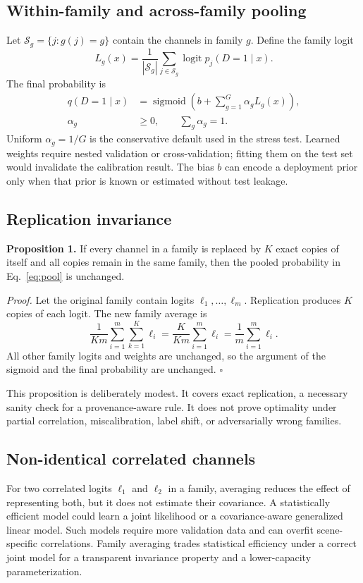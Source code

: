 \documentclass[10pt,conference]{IEEEtran}
\newcommand{\logit}{\operatorname{logit}}
\newcommand{\sigmoid}{\operatorname{sigmoid}}
\begin{document}
\subsection{Within-family and across-family pooling}
Let $\mathcal S_g=\{j:g(j)=g\}$ contain the channels in family $g$. Define the family logit
\begin{equation}
L_g(x)=\frac{1}{|\mathcal S_g|}\sum_{j\in\mathcal S_g}\logit p_j(D=1\mid x).
\label{eq:familylogit}
\end{equation}
The final probability is
\begin{equation}
\begin{aligned}
q(D=1\mid x)&=\sigmoid\left(b+\sum_{g=1}^{G}\alpha_g L_g(x)\right),\\
\alpha_g&\ge 0,\qquad \sum_g\alpha_g=1.
\end{aligned}
\label{eq:pool}
\end{equation}
Uniform $\alpha_g=1/G$ is the conservative default used in the stress test. Learned weights require nested validation or cross-validation; fitting them on the test set would invalidate the calibration result. The bias $b$ can encode a deployment prior only when that prior is known or estimated without test leakage.

\subsection{Replication invariance}
\textbf{Proposition 1.} If every channel in a family is replaced by $K$ exact copies of itself and all copies remain in the same family, then the pooled probability in Eq.~\eqref{eq:pool} is unchanged.

\textit{Proof.} Let the original family contain logits $\ell_1,\ldots,\ell_m$. Replication produces $K$ copies of each logit. The new family average is
\begin{equation}
\frac{1}{Km}\sum_{i=1}^{m}\sum_{k=1}^{K}\ell_i
=\frac{K}{Km}\sum_{i=1}^{m}\ell_i
=\frac{1}{m}\sum_{i=1}^{m}\ell_i.
\end{equation}
All other family logits and weights are unchanged, so the argument of the sigmoid and the final probability are unchanged. $\square$

This proposition is deliberately modest. It covers exact replication, a necessary sanity check for a provenance-aware rule. It does not prove optimality under partial correlation, miscalibration, label shift, or adversarially wrong families.

\subsection{Non-identical correlated channels}
For two correlated logits $\ell_1$ and $\ell_2$ in a family, averaging reduces the effect of representing both, but it does not estimate their covariance. A statistically efficient model could learn a joint likelihood or a covariance-aware generalized linear model. Such models require more validation data and can overfit scene-specific correlations. Family averaging trades statistical efficiency under a correct joint model for a transparent invariance property and a lower-capacity parameterization.
\end{document}
